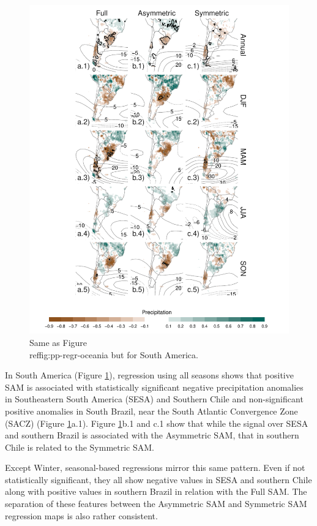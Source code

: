 \documentclass[smallextended]{svjour3}       %
\begin{document}
\begin{figure}
\includegraphics{pp-regr-america-1} \caption{Same as Figure \\ref{fig:pp-regr-oceania} but for South America.}\label{fig:pp-regr-america}
\end{figure}

In South America (Figure \ref{fig:pp-regr-america}), regression using all seasons shows that positive SAM is associated with statistically significant negative precipitation anomalies in Southeastern South America (SESA) and Southern Chile and non-significant positive anomalies in South Brazil, near the South Atlantic Convergence Zone (SACZ) (Figure \ref{fig:pp-regr-america}a.1). Figure \ref{fig:pp-regr-america}b.1 and c.1 show that while the signal over SESA and southern Brazil is associated with the Asymmetric SAM, that in southern Chile is related to the Symmetric SAM.

Except Winter, seasonal-based regressions mirror this same pattern. Even if not statistically significant, they all show negative values in SESA and southern Chile along with positive values in southern Brazil in relation with the Full SAM. The separation of these features between the Asymmetric SAM and Symmetric SAM regression maps is also rather consistent.
\end{document}
